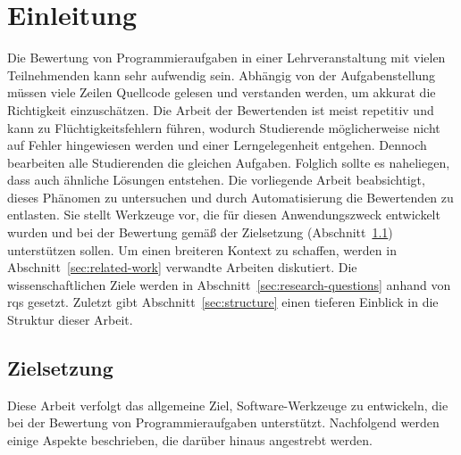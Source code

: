 \chapter{Einleitung}\label{ch:introduction}

Die Bewertung von Programmieraufgaben in einer Lehrveranstaltung mit vielen Teilnehmenden kann sehr aufwendig sein.
Abhängig von der Aufgabenstellung müssen viele Zeilen Quellcode gelesen und verstanden werden, um akkurat die Richtigkeit einzuschätzen.
Die Arbeit der Bewertenden ist meist repetitiv und kann zu Flüchtigkeitsfehlern führen, wodurch Studierende möglicherweise nicht auf Fehler hingewiesen werden und einer Lerngelegenheit entgehen.
Dennoch bearbeiten alle Studierenden die gleichen Aufgaben.
Folglich sollte es naheliegen, dass auch ähnliche Lösungen entstehen.
Die vorliegende Arbeit beabsichtigt, dieses Phänomen zu untersuchen und durch Automatisierung die Bewertenden zu entlasten.
Sie stellt Werkzeuge vor, die für diesen Anwendungszweck entwickelt wurden und bei der Bewertung gemäß der Zielsetzung (Abschnitt~\ref{sec:goals}) unterstützen sollen.
Um einen breiteren Kontext zu schaffen, werden in Abschnitt~\ref{sec:related-work} verwandte Arbeiten diskutiert.
Die wissenschaftlichen Ziele werden in Abschnitt~\ref{sec:research-questions} anhand von \acp{rq} gesetzt.
Zuletzt gibt Abschnitt~\ref{sec:structure} einen tieferen Einblick in die Struktur dieser Arbeit.

\section{Zielsetzung}\label{sec:goals}

Diese Arbeit verfolgt das allgemeine Ziel, Software-Werkzeuge zu entwickeln, die bei der Bewertung von Programmieraufgaben unterstützt.
Nachfolgend werden einige Aspekte beschrieben, die darüber hinaus angestrebt werden.

